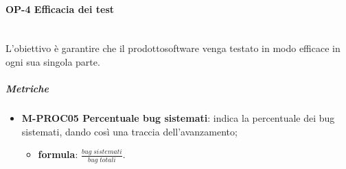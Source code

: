 	\paragraph{OP-4 Efficacia dei test}\mbox{} \\ [1mm]
	L'obiettivo è garantire che il prodotto\glosp software venga testato in modo efficace in ogni sua singola parte.
	\subparagraph{Metriche}
	\begin{itemize}
		\item \textbf{M-PROC05 Percentuale bug sistemati}: indica la percentuale dei bug sistemati, dando così una traccia dell'avanzamento;
		\begin{itemize}
			\item[] \textbf{formula}: $\frac{bug \; sistemati}{bug \; totali}$.
		\end{itemize}
	\end{itemize}

